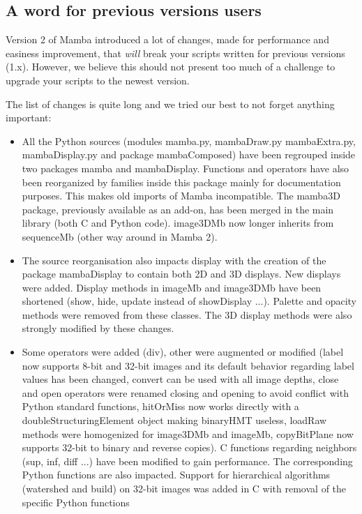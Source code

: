 \documentclass[a4paper,10pt,oneside]{article}
\begin{document}
\subsection{A word for previous versions users}
\label{cha:change_mamba2}

Version 2 of Mamba introduced a lot of changes, made for performance and
easiness improvement, that \emph{will} break your scripts written for previous
versions (1.x). However, we believe this should not present too much of a
challenge to upgrade your scripts to the newest version.

The list of changes is quite long and we tried our best to not forget
anything important:
\begin{itemize}
\item All the Python sources (modules mamba.py, mambaDraw.py mambaExtra.py,
mambaDisplay.py and package mambaComposed) have been regrouped inside two packages
mamba and mambaDisplay. Functions and operators have also been reorganized
by families inside this package mainly for documentation purposes. This makes old
imports of Mamba incompatible. The mamba3D package, previously available as an
add-on, has been merged in the main library (both C and Python code). image3DMb 
now longer inherits from sequenceMb (other way around in Mamba 2).
\item The source reorganisation also impacts display with the creation of
the package mambaDisplay to contain both 2D and 3D displays. New displays were
added. Display methods in imageMb and image3DMb have been shortened (show,
hide, update instead of showDisplay ...). Palette and opacity methods were
removed from these classes. The 3D display methods were also strongly
modified by these changes.
\item Some operators were added (div), other were augmented or modified 
(label now supports 8-bit and 32-bit images and its default behavior regarding
label values has been changed, convert can be used with all image depths, close
and open operators were renamed closing and opening to avoid conflict with
Python standard functions, hitOrMiss now works directly with a
doubleStructuringElement object making binaryHMT useless, loadRaw methods were
homogenized for image3DMb and imageMb, copyBitPlane now supports 32-bit to
binary and reverse copies). C functions regarding neighbors (sup, inf, diff ...)
have been modified to gain performance. The corresponding Python functions are
also impacted. Support for hierarchical algorithms (watershed and build) on
32-bit images was added in C with removal of the specific Python functions

\end{itemize}
\end{document}
